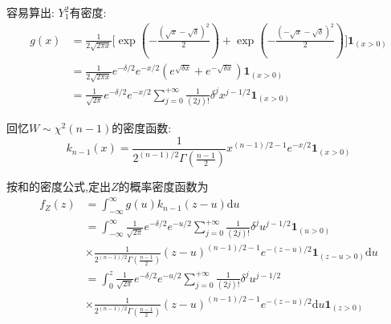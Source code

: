 	\begin{frame}
		容易算出: $Y_1^2$有密度:
		\begin{equation}
			\begin{split}
				g(x) &= \frac{1}{2\sqrt{2\pi x}}\bigg[\exp(-\frac{(\sqrt{x}-\sqrt{\delta})^2}{2})+\exp(-\frac{(-\sqrt{x}-\sqrt{\delta})^2}{2})\bigg]\bm{1}_{(x>0)} \\
				&= \frac{1}{2\sqrt{2\pi x}} e^{-\delta/2}e^{-x/2}(e^{\sqrt{\delta x}}+e^{-\sqrt{\delta x}})\bm{1}_{(x>0)} \\
				&= \frac{1}{\sqrt{2\pi }} e^{-\delta/2}e^{-x/2}\sum_{j=0}^{+\infty}\frac{1}{(2j)!}\delta^{j}x^{j-1/2}\bm{1}_{(x>0)}
			\end{split}
		\end{equation}
		
		回忆$W\sim\chi^2(n-1)$的密度函数:
		\begin{equation}
			k_{n-1}(x) = \frac{1}{2^{(n-1)/2}\Gamma(\frac{n-1}{2})}x^{(n-1)/2-1}e^{-x/2}\bm{1}_{(x>0)}
		\end{equation}
	\end{frame}

	\begin{frame}
		按和的密度公式,定出$Z$的概率密度函数为
		\begin{equation}
			\begin{split}
				f_Z(z) &= \int_{-\infty}^{\infty}g(u)k_{n-1}(z-u)\mathrm{d}u \\
				&= \int_{-\infty}^{\infty}\frac{1}{\sqrt{2\pi }} e^{-\delta/2}e^{-u/2}\sum_{j=0}^{+\infty}\frac{1}{(2j)!}\delta^{j}u^{j-1/2}\bm{1}_{(u>0)} \\
				&\times\frac{1}{2^{(n-1)/2}\Gamma(\frac{n-1}{2})}(z-u)^{(n-1)/2-1}e^{-(z-u)/2}\bm{1}_{(z-u>0)}\mathrm{d}u \\
				&= \int_{0}^{z}\frac{1}{\sqrt{2\pi }} e^{-\delta/2}e^{-u/2}\sum_{j=0}^{+\infty}\frac{1}{(2j)!}\delta^{j}u^{j-1/2}\\
				&\times\frac{1}{2^{(n-1)/2}\Gamma(\frac{n-1}{2})}(z-u)^{(n-1)/2-1}e^{-(z-u)/2}\mathrm{d}u \bm{1}_{(z>0)}
			\end{split}
		\end{equation}
	\end{frame}

